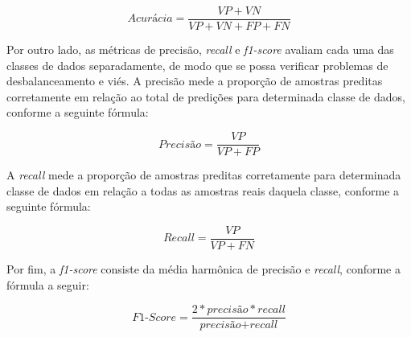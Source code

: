 \begin{center}
  \[
  \textit{Acurácia} = \frac{VP + VN}{VP + VN + FP + FN}
  \]
\end{center}

Por outro lado, as métricas de precisão, \textit{recall} e \textit{f1-score} avaliam cada uma das classes de dados separadamente, de modo que se possa verificar problemas de desbalanceamento e viés. A precisão mede a proporção de amostras preditas corretamente em relação ao total de predições para determinada classe de dados, conforme a seguinte fórmula:

\begin{center}
  \[
  \textit{Precisão} = \frac{VP}{VP + FP}
  \]
\end{center}

A \textit{recall} mede a proporção de amostras preditas corretamente para determinada classe de dados em relação a todas as amostras reais daquela classe, conforme a seguinte fórmula:

\begin{center}
  \[
  \textit{Recall} = \frac{VP}{VP + FN}
  \]
\end{center}

Por fim, a \textit{f1-score} consiste da média harmônica de precisão e \textit{recall}, conforme a fórmula a seguir:

\begin{center}
  \[
  \textit{F1-Score} = \frac{2 * \textit{precisão} * \textit{recall}}{\textit{precisão} + \textit{recall}}
  \]
\end{center}
